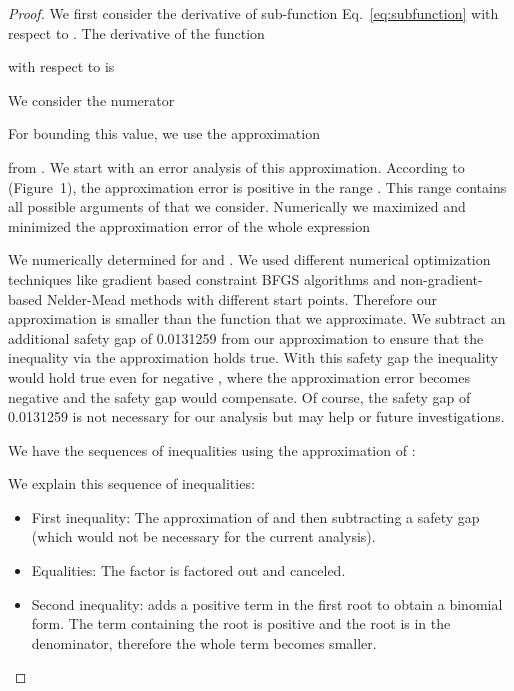 \documentclass{article}
\begin{document}
\begin{proof}
We first consider the derivative of sub-function
Eq.~\eqref{eq:subfunction} with respect to .
The derivative of the function 

with respect to  is
 


We consider the numerator


For bounding this value, we use the approximation 

from \citet{Ren:07}.
We start with an error analysis of this approximation.
According to \citet{Ren:07} (Figure~1), the approximation 
error is positive in the range
.  This range contains all possible
arguments of  that we consider.
Numerically we maximized and minimized the approximation error of the
whole expression

We numerically determined  for 
 and . 
We used different numerical optimization techniques like  
gradient based constraint BFGS algorithms and 
non-gradient-based Nelder-Mead methods with different start points.
Therefore our approximation is smaller than the function that we
approximate. 
We subtract an additional safety gap of 0.0131259 from our
approximation to ensure that the inequality via the approximation
holds true. With this safety gap the inequality would hold true even 
for negative , where the approximation error becomes negative and
the safety gap would compensate.
Of course, the safety gap of 0.0131259 is not necessary for our
analysis but may help or future investigations.

We have the sequences of inequalities using the approximation of \citet{Ren:07}:



We explain this sequence of inequalities:
\begin{itemize} 
\item First inequality: The approximation of \citet{Ren:07}
and then subtracting a safety gap (which would not be necessary for the
current analysis).

\item Equalities: The factor  is factored out and
  canceled. 

\item Second inequality: adds a positive term in the first root to
  obtain a binomial form. The term containing the root 
is positive and the root is in the denominator, 
therefore the whole term becomes smaller.
\end{itemize}
\begin{itemize} 


\end{itemize}
\end{proof}
\end{document}
